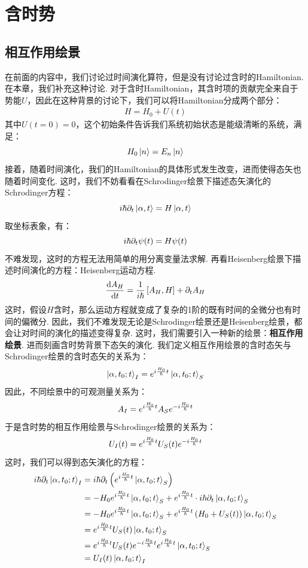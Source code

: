 \chapter{含时势}
\section{相互作用绘景}
在前面的内容中，我们讨论过时间演化算符，但是没有讨论过含时的Hamiltonian. 在本章，我们补充这种讨论. 对于含时Hamiltonian，其含时项的贡献完全来自于势能\(U\)，因此在这种背景的讨论下，我们可以将Hamiltonian分成两个部分：
\begin{align*}
H = H_{0} + U(t)
\end{align*}
其中\(U(t=0)=0\)，这个初始条件告诉我们系统初始状态是能级清晰的系统，满足：
\[
H_{0}\ket{n} = E_{n}\ket{n}
\]
接着，随着时间演化，我们的Hamiltonian的具体形式发生改变，进而使得态矢也随着时间变化. 这时，我们不妨看看在Schrodinger绘景下描述态矢演化的Schrodinger方程：
\[
i\hbar\partial_{t}\ket{\alpha,t} = H\ket{\alpha,t}
\]
取坐标表象，有：
\[
i\hbar\partial_{t}\psi(t) = H\psi(t) 
\]
不难发现，这时的方程无法用简单的用分离变量法求解. 再看Heisenberg绘景下描述时间演化的方程：Heisenberg运动方程. 
\begin{align*}
\frac{\mathrm{d} A_{H}}{\mathrm{d}t} = \frac{1}{i\hbar}\left[{A_{H},H}\right] + \partial_{t} A_{H}
\end{align*}
这时，假设\(H\)含时，那么运动方程就变成了复杂的1阶的既有时间的全微分也有时间的偏微分. 因此，我们不难发现无论是Schrodinger绘景还是Heisenberg绘景，都会让对时间的演化的描述变得复杂. 这时，我们需要引入一种新的绘景：\textbf{相互作用绘景}. 进而刻画含时势背景下态矢的演化. 我们定义相互作用绘景的含时态矢与Schrodinger绘景的含时态矢的关系为：
\[
\ket{\alpha,t_{0};t}_{I} = e^{i\frac{H_{0}}{\hbar}t}\ket{\alpha,t_{0};t}_{S}
\]
因此，不同绘景中的可观测量关系为：
\[
A_{I} = e^{i\frac{H_{0}}{\hbar}t}A_{S}e^{-i\frac{H_{0}}{\hbar}t}
\]
于是含时势的相互作用绘景与Schrodinger绘景的关系为：
\[
U_{I}(t) = e^{i\frac{H_{0}}{\hbar}t}U_{S}(t)e^{-i\frac{H_{0}}{\hbar}t}
\]
这时，我们可以得到态矢演化的方程：
\begin{align*}
i\hbar\partial_{t}\ket{\alpha,t_{0};t}_{I} 
& = i\hbar\partial_{t}\left({e^{i\frac{H_{0}}{\hbar}t}\ket{\alpha,t_{0};t}_{S}}\right) \\
& = -H_{0}e^{i\frac{H_{0}}{\hbar}t}\ket{\alpha,t_{0};t}_{S} + e^{i\frac{H_{0}}{\hbar}t}\cdot i\hbar\partial_{t}\ket{\alpha,t_{0};t}_{S} \\
& = -H_{0}e^{i\frac{H_{0}}{\hbar}t}\ket{\alpha,t_{0};t}_{S} + e^{i\frac{H_{0}}{\hbar}t}\left({H_{0} + U_{S}(t)}\right)\ket{\alpha,t_{0};t}_{S} \\
& = e^{i\frac{H_{0}}{\hbar}t}U_{S}(t)\ket{\alpha,t_{0};t}_{S} \\
& = e^{i\frac{H_{0}}{\hbar}t}U_{S}(t)e^{-i\frac{H_{0}}{\hbar}t}e^{i\frac{H_{0}}{\hbar}t}\ket{\alpha,t_{0};t}_{S} \\
& = U_{I}(t)\ket{\alpha,t_{0};t}_{I}
\end{align*}
